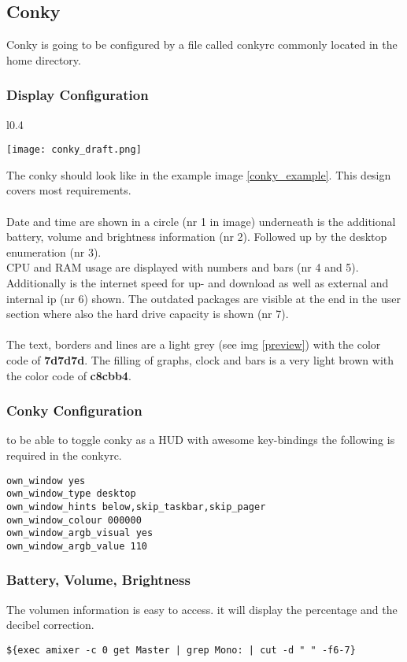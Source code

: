 \subsection{Conky}
	Conky is going to be configured by a file called conkyrc commonly located in the home directory.
	\subsubsection{Display Configuration}
		\begin{wrapfigure}{l}{0.4\textwidth}
			\begin{center}
				\texttt{[image: conky\_draft.png]}			
			\end{center}
			\caption{conky design draft}
			\label{conky_example}
		\end{wrapfigure}
		
		The conky should look like in the example image \ref{conky_example}. This design covers most requirements.\\
		\\
		Date and time are shown in a circle (nr 1 in image) underneath is the additional battery, volume and brightness information (nr 2). Followed up by the desktop enumeration (nr 3).\\
		CPU and RAM usage are displayed with numbers and bars (nr 4 and 5).\\
		Additionally is the internet speed for up- and download as well as external and internal ip (nr 6) shown. The outdated packages are visible at the end in the user section where also the hard drive capacity is shown (nr 7).\\
		\\
		The text, borders and lines are a light grey (see img \ref{preview}) with the color code of \textbf{7d7d7d}. The filling of graphs, clock and bars is a very light brown with the color code of \textbf{c8cbb4}.
	\subsubsection{Conky Configuration}
		to be able to toggle conky as a HUD with awesome key-bindings the following is required in the conkyrc.
		\begin{lstlisting}
own_window yes
own_window_type desktop
own_window_hints below,skip_taskbar,skip_pager
own_window_colour 000000
own_window_argb_visual yes
own_window_argb_value 110		
		\end{lstlisting}
		
\clearpage
	\subsubsection{Battery, Volume, Brightness}
		The volumen information is easy to access. it will display the percentage and the decibel correction.
		\begin{lstlisting}
${exec amixer -c 0 get Master | grep Mono: | cut -d " " -f6-7}
		\end{lstlisting}
		

